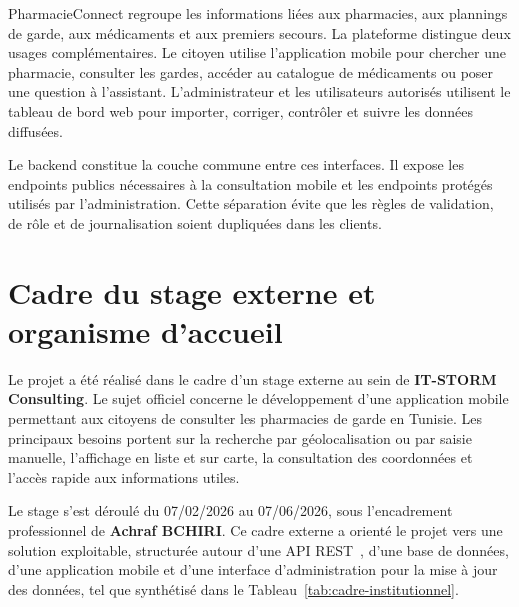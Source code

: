 PharmacieConnect regroupe les informations liées aux pharmacies, aux plannings de garde, aux médicaments et
aux premiers secours. La plateforme distingue deux usages complémentaires. Le citoyen utilise l'application
mobile pour chercher une pharmacie, consulter les gardes, accéder au catalogue de médicaments ou poser une
question à l'assistant. L'administrateur et les utilisateurs autorisés utilisent le tableau de bord web pour
importer, corriger, contrôler et suivre les données diffusées.

Le backend constitue la couche commune entre ces interfaces. Il expose les endpoints publics nécessaires à
la consultation mobile et les endpoints protégés utilisés par l'administration. Cette séparation évite que
les règles de validation, de rôle et de journalisation soient dupliquées dans les clients.

\section{Cadre du stage externe et organisme d'accueil}

Le projet a été réalisé dans le cadre d'un stage externe au sein de \textbf{IT-STORM Consulting}. Le sujet
officiel concerne le développement d'une application mobile permettant aux citoyens de consulter les
pharmacies de garde en Tunisie. Les principaux besoins portent sur la recherche par géolocalisation ou
par saisie manuelle, l'affichage en liste et sur carte, la consultation des coordonnées et l'accès rapide
aux informations utiles.

Le stage s'est déroulé du 07/02/2026 au 07/06/2026, sous l'encadrement professionnel de
\textbf{Achraf BCHIRI}. Ce cadre externe a orienté le projet vers une solution exploitable, structurée
autour d'une API REST~\cite{fielding}, d'une base de données, d'une application mobile et d'une interface
d'administration pour la mise à jour des données, tel que synthétisé dans le Tableau~\ref{tab:cadre-institutionnel}.

